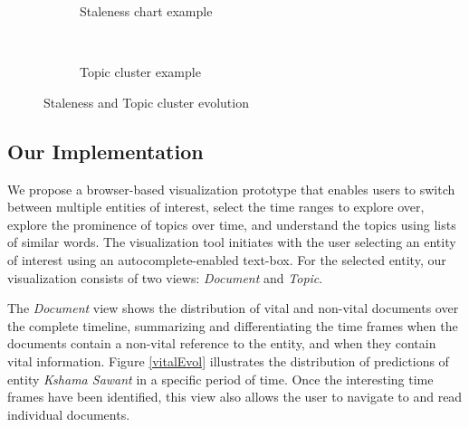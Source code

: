 \documentclass{article}
\begin{document}
\begin{figure}[tb]
\begin{subfigure}[b]{0.4\textwidth}
			\caption{Staleness chart example}
			\label{stalenessEvol}
        \end{subfigure}
        \\
        \begin{subfigure}[b]{0.25\textwidth}
			\caption{Topic cluster example}
			\label{wordcloud}
        \end{subfigure}
        \caption{Staleness and Topic cluster evolution}
\end{figure}

\subsection{Our Implementation}

We propose a browser-based visualization prototype that enables users to switch between multiple entities of interest, select the time ranges to explore over, explore the prominence of topics over time, and understand the topics using lists of similar words.
The visualization tool initiates with the user selecting an entity of interest using an autocomplete-enabled text-box.
For the selected entity, our visualization consists of two views: \emph{Document} and \emph{Topic}.

The \emph{Document} view shows the distribution of vital and non-vital documents over the complete timeline, summarizing and differentiating the time frames when the documents contain a non-vital reference to the entity, and when they contain vital information.
Figure \ref{vitalEvol} illustrates the distribution of predictions of entity \emph{Kshama Sawant} in a specific period of time. %
Once the interesting time frames have been identified, this view also allows the user to navigate to and read individual documents. 
\end{document}
